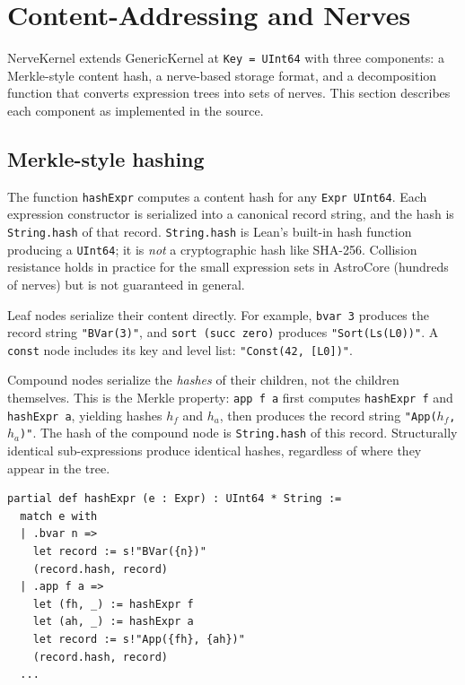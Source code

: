 \section{Content-Addressing and Nerves}\label{sec:nerves}

NerveKernel extends GenericKernel at \texttt{Key = UInt64} with three components: a Merkle-style content hash, a nerve-based storage format, and a decomposition function that converts expression trees into sets of nerves.  This section describes each component as implemented in the source.

\subsection{Merkle-style hashing}\label{sec:hash}

The function \texttt{hashExpr} computes a content hash for any \texttt{Expr UInt64}.  Each expression constructor is serialized into a canonical record string, and the hash is \texttt{String.hash} of that record.  \texttt{String.hash} is Lean's built-in hash function producing a \texttt{UInt64}; it is \emph{not} a cryptographic hash like SHA-256.  Collision resistance holds in practice for the small expression sets in AstroCore (hundreds of nerves) but is not guaranteed in general.

Leaf nodes serialize their content directly.  For example, \texttt{bvar 3} produces the record string \texttt{"BVar(3)"}, and \texttt{sort (succ zero)} produces \texttt{"Sort(Ls(L0))"}.  A \texttt{const} node includes its key and level list: \texttt{"Const(42, [L0])"}.

Compound nodes serialize the \emph{hashes} of their children, not the children themselves.  This is the Merkle property: \texttt{app f a} first computes \texttt{hashExpr f} and \texttt{hashExpr a}, yielding hashes $h_f$ and $h_a$, then produces the record string \texttt{"App($h_f$, $h_a$)"}.  The hash of the compound node is \texttt{String.hash} of this record.  Structurally identical sub-expressions produce identical hashes, regardless of where they appear in the tree.

\begin{lstlisting}[language={},morekeywords={partial,def,match,with,let}]
partial def hashExpr (e : Expr) : UInt64 * String :=
  match e with
  | .bvar n =>
    let record := s!"BVar({n})"
    (record.hash, record)
  | .app f a =>
    let (fh, _) := hashExpr f
    let (ah, _) := hashExpr a
    let record := s!"App({fh}, {ah})"
    (record.hash, record)
  ...
\end{lstlisting}

